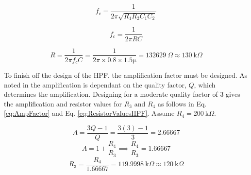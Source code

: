 \begin{equation}
   f_{c} = \frac{1}{2 \pi \sqrt{R_{1} R_{2} C_{1} C_{2}}}
   \label{eq:HPFCorner} 
\end{equation} 

 \begin{equation}
    f_{c} = \frac{1}{2 \pi R C}  
    \label{eq:HPFCornerNew} 
\end{equation}

\[   R = \frac{1}{2 \pi f_{c} C} = \frac{1}{2 \pi \times 0.8 \times 1.5 \si{\micro}} = \SI{132629}{\Omega} \approx \SI{130}{\kilo\Omega}  \]
\par
To finish off the design of the HPF, the amplification factor must be designed. As noted in \cite{Sallen} the amplification is dependant on the quality factor, $Q$, which determines the amplification. Designing for a moderate quality factor of 3 gives the amplification and resistor values for $R_{3}$ and $R_{4}$ as follows in Eq. \ref{eq:AmpFactor} and Eq. \ref{eq:ResistorValuesHPF}. Assume $R_{4} = \SI{200}{\kilo\Omega}$.

\begin{equation}
    A = \frac{3 Q - 1}{Q} = \frac{3 (3) - 1}{3} = 2.66667  
    \label{eq:AmpFactor} 
\end{equation}
\[      A = 1 + \frac{R_{4}}{R_{3}} \implies  \frac{R_{4}}{R_{3}} = 1.66667    \]
\begin{equation}
    R_{3} = \frac{R_{4}}{1.66667} = \SI{119.9998}{\kilo\Omega} \approx \SI{120}{\kilo\Omega}
    \label{eq:ResistorValuesHPF} 
\end{equation}
 

